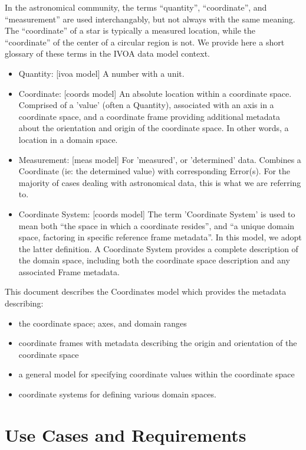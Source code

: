 \documentclass[11pt,a4paper]{ivoa}
\begin{document}
In the astronomical community, the terms ``quantity'', ``coordinate'', and ``measurement'' are used interchangably, but not always 
with the same meaning.  The ``coordinate'' of a star is typically a measured location, while the ``coordinate'' of the center
of a circular region is not.  We provide here a short glossary of these terms in the IVOA data model context.
\begin{itemize}
  \item Quantity: [ivoa model]  A number with a unit.
  \item Coordinate: [coords model]  An absolute location within a coordinate space.  Comprised of a 'value' (often a Quantity), 
associated with an axis in a coordinate space, and a coordinate frame providing additional metadata about the orientation and origin of the coordinate space.
In other words, a location in a domain space.
  \item Measurement: [meas model]  For 'measured', or 'determined' data.  Combines a Coordinate (ie: the determined value) with 
corresponding Error(s).  For the majority of cases dealing with astronomical data, this is what we are referring to.
  \item Coordinate System: [coords model]  The term 'Coordinate System' is used to mean both ``the space in which a coordinate resides'', and ``a unique domain space, factoring in specific reference frame metadata''.  In this model, we adopt the latter definition.  A Coordinate System provides a complete description of the domain space, including both the coordinate space description and any associated Frame metadata.
\end{itemize}

This document describes the Coordinates model which provides the metadata describing:
\begin{itemize}
\item the coordinate space; axes, and domain ranges
\item coordinate frames with metadata describing the origin and orientation of the coordinate space
\item a general model for specifying coordinate values within the coordinate space
\item coordinate systems for defining various domain spaces.
\end{itemize}

\section{Use Cases and Requirements}
\label{sect:ucreq}
\end{document}
